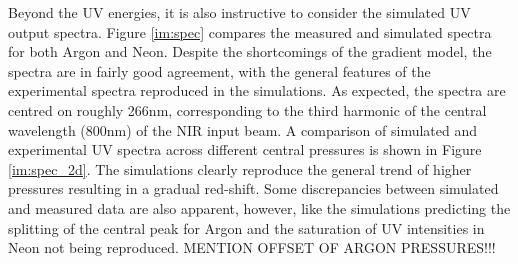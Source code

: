 \documentclass[a4paper]{jpconf}
\begin{document}
Beyond the UV energies, it is also instructive to consider the simulated UV output spectra. Figure \ref{im:spec} compares the measured and simulated spectra for both Argon and Neon. Despite the shortcomings of the gradient model, the spectra are in fairly good agreement, with the general features of the experimental spectra reproduced in the simulations. As expected, the spectra are centred on roughly 266nm, corresponding to the third harmonic of the central wavelength (800nm) of the NIR input beam. A comparison of simulated and experimental UV spectra across different central pressures is shown in Figure \ref{im:spec_2d}. The simulations clearly reproduce the general trend of higher pressures resulting in a gradual red-shift. Some discrepancies between simulated and measured data are also apparent, however, like the simulations predicting the splitting of the central peak for Argon and the saturation of UV intensities in Neon not being reproduced. 
MENTION OFFSET OF ARGON PRESSURES!!!
\end{document}
